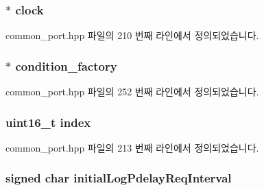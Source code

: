 \subsubsection[{\texorpdfstring{clock}{clock}}]{$\ast$ clock}\hypertarget{struct_port_init__t_aeea9361231f8c60d763d5f74cf822f2b}{}\label{struct_port_init__t_aeea9361231f8c60d763d5f74cf822f2b}


common\+\_\+port.\+hpp 파일의 210 번째 라인에서 정의되었습니다.

\subsubsection[{\texorpdfstring{condition\+\_\+factory}{condition_factory}}]{$\ast$ condition\+\_\+factory}\hypertarget{struct_port_init__t_add9d8cd27f9135b6f5ded06c01a930f2}{}\label{struct_port_init__t_add9d8cd27f9135b6f5ded06c01a930f2}


common\+\_\+port.\+hpp 파일의 252 번째 라인에서 정의되었습니다.

\subsubsection[{\texorpdfstring{index}{index}}]{\setlength{\rightskip}{0pt plus 5cm}uint16\+\_\+t index}\hypertarget{struct_port_init__t_a852b86a2eaee9852ada7a43e61e311a2}{}\label{struct_port_init__t_a852b86a2eaee9852ada7a43e61e311a2}


common\+\_\+port.\+hpp 파일의 213 번째 라인에서 정의되었습니다.

\subsubsection[{\texorpdfstring{initial\+Log\+Pdelay\+Req\+Interval}{initialLogPdelayReqInterval}}]{\setlength{\rightskip}{0pt plus 5cm}signed char initial\+Log\+Pdelay\+Req\+Interval}\hypertarget{struct_port_init__t_a7595d62409f4880035eb20c62b64ea7c}{}\label{struct_port_init__t_a7595d62409f4880035eb20c62b64ea7c}


